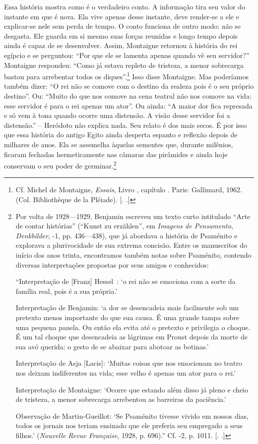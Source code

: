 Essa história mostra como é o verdadeiro conto. A informação tira seu
valor do instante em que é nova. Ela vive apenas desse instante, deve
render-se a ele e explicar-se nele sem perda de tempo. O conto funciona
de outro modo: não se desgasta. Ele guarda em si mesmo suas forças
reunidas e longo tempo depois ainda é capaz de se desenvolver. Assim,
Montaigne retornou à história do rei egípcio e se perguntou: ``Por que ele
se lamenta apenas quando vê seu servidor?'' Montaigne respondeu: ``Como já
estava repleto de tristeza, a menor sobrecarga bastou para arrebentar
todos os diques''.\footnote{Cf. Michel de Montaigne, \emph{Essais},
  Livro , capítulo . Paris: Gallimard, 1962. (Col. Bibliothèque de la
  Pléiade). [. .]} Isso disse Montaigne. Mas poderíamos também
dizer: ``O rei não se comove com o destino da realeza pois é o seu
próprio destino''. Ou: ``Muito do que nos comove na cena teatral não nos
comove na vida: esse servidor é para o rei apenas um ator''. Ou ainda:
``A maior dor fica represada e só vem à tona quando ocorre uma
distensão. A visão desse servidor foi a distensão.'' -- Heródoto não
explica nada. Seu relato é dos mais secos. É por isso que essa história
do antigo Egito ainda desperta espanto e reflexão depois de milhares de
anos. Ela se assemelha àquelas sementes que, durante milênios, ficaram
fechadas hermeticamente nas câmaras das pirâmides e ainda hoje conservam
o seu poder de germinar.\footnote{Por volta de 1928---1929, Benjamin
  escreveu um texto curto intitulado ``Arte de contar histórias''
  (``Kunst zu erzählen'', em \emph{Imagens de Pensamento},
  \emph{Denkbilder},  -1, pp. 436---438), que já abordava a história
  de Psaménito e explorava a plurivocidade de sua extrema concisão.
  Entre os manuscritos do início dos anos trinta, encontramos também
  notas sobre Psaménito, contendo diversas interpretações propostas por
  seus amigos e conhecidos:

  ``Interpretação de [Franz] Hessel~: `o rei não se emociona com a
  sorte da família real, pois é a sua própria.'

  Interpretação de Benjamin: `a dor se desencadeia mais facilmente sob
  um pretexto menos importante do que sua causa. É uma grande tampa
  sobre uma pequena panela. Ou então ela evita até o pretexto e
  privilegia o choque. É um tal choque que desencadeia as lágrimas em
  Proust depois da morte de sua avó querida: o gesto de se abaixar para
  abotoar as botinas.'

  Interpretação de Asja [Lacis]: `Muitas coisas que nos emocionam no
  teatro nos deixam indiferentes na vida; esse velho é apenas um ator
  para o rei.'

  Interpretação de Montaigne: `Ocorre que estando além disso já pleno e
  cheio de tristeza, a menor sobrecarga arrebentou as barreiras da
  paciência.'

  Observação de Martin-Gueillot: `Se Psaménito tivesse vivido em nossos
  dias, todos os jornais nos teriam ensinado que ele preferia seu
  empregado a seus filhos.' (\emph{Nouvelle Revue Française}, 1928, p.
  696).'' Cf.  -2, p. 1011. [. .]}

